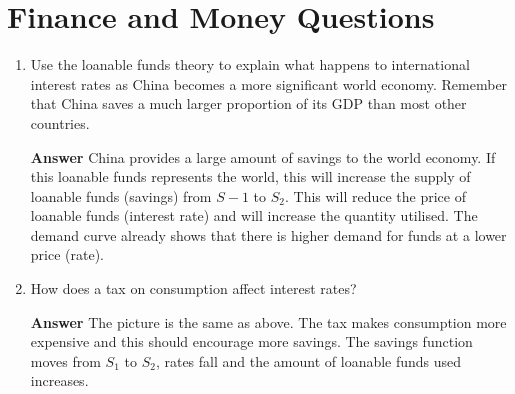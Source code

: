 \documentclass[14pt]{article}
\begin{document}
\section*{Finance and Money Questions}
\begin{enumerate}
\item Use the loanable funds theory to explain what happens to international interest rates as China becomes a more significant world economy.  Remember that China saves a much larger proportion of its GDP than most other countries. 

\textbf{Answer}
China provides a large amount of savings to the world economy.  If this loanable funds represents the world, this will increase the supply of loanable funds (savings) from $S-1$ to $S_2$.  This will reduce the price of loanable funds (interest rate) and will increase the quantity utilised.  The demand curve already shows that there is higher demand for funds at a lower price (rate). 


\item How does a tax on consumption affect interest rates?

\textbf{Answer}
The picture is the same as above. The tax makes consumption more expensive and this should encourage more savings.  The savings function moves from $S_1$ to $S_2$, rates fall and the amount of loanable funds used increases. 


\end{enumerate}
\end{document}
